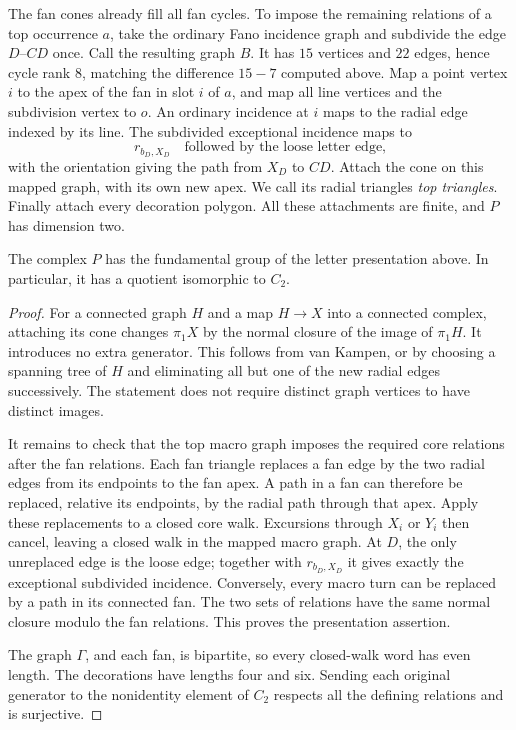 The fan cones already fill all fan cycles. To impose the remaining
relations of a top occurrence $a$, take the ordinary Fano incidence
graph and subdivide the edge $D$--$CD$ once. Call the resulting graph
$B$. It has $15$ vertices and $22$ edges, hence cycle rank $8$,
matching the difference $15-7$ computed above. Map a point vertex $i$ to the apex
of the fan in slot $i$ of $a$, and map all line vertices and the
subdivision vertex to $o$. An ordinary incidence at $i$ maps to the
radial edge indexed by its line. The subdivided exceptional incidence maps to
\[
 r_{b_D,X_D}\quad\text{followed by the loose letter edge,}
\]
with the orientation giving the path from $X_D$ to $CD$. Attach the cone on this mapped graph, with its own new apex. We call its radial triangles \emph{top triangles}. Finally attach every decoration polygon. All these attachments are finite, and $P$ has dimension two.

\begin{lemma}\label{lem:model-presentation}
The complex $P$ has the fundamental group of the letter presentation above. In particular, it has a quotient isomorphic to $C_2$.
\end{lemma}
\begin{proof}
For a connected graph $H$ and a map $H\to X$ into a connected complex, attaching its cone changes $\pi_1X$ by the normal closure of the image of $\pi_1H$. It introduces no extra generator. This follows from van Kampen, or by choosing a spanning tree of $H$ and eliminating all but one of the new radial edges successively. The statement does not require distinct graph vertices to have distinct images.

It remains to check that the top macro graph imposes the required core relations after the fan relations. Each fan triangle replaces a fan edge by the two radial edges from its endpoints to the fan apex. A path in a fan can therefore be replaced, relative its endpoints, by the radial path through that apex. Apply these replacements to a closed core walk. Excursions through $X_i$ or $Y_i$ then cancel, leaving a closed walk in the mapped macro graph. At $D$, the only unreplaced edge is the loose edge; together with $r_{b_D,X_D}$ it gives exactly the exceptional subdivided incidence. Conversely, every macro turn can be replaced by a path in its connected fan. The two sets of relations have the same normal closure modulo the fan relations. This proves the presentation assertion.

The graph $\Gamma$, and each fan, is bipartite, so every closed-walk word has even length. The decorations have lengths four and six. Sending each original generator to the nonidentity element of $C_2$ respects all the defining relations and is surjective.
\end{proof}

